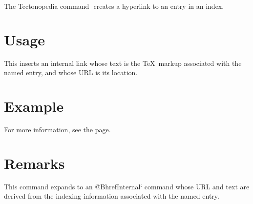 
The Tectonopedia command \b{\string\pediaLinkRef} creates a hyperlink to an
entry in an index.

\section*{Usage}

\begin{texdisp}
\end{texdisp}

This inserts an internal link whose text is the \TeX\ markup associated with
the named entry, and whose URL is its location.

\section*{Example}

\begin{texdisp}
For more information, see the  page.
\end{texdisp}

\section*{Remarks}

This command expands to an \`@BhrefInternal` command whose URL and text are
derived from the indexing information associated with the named entry.

